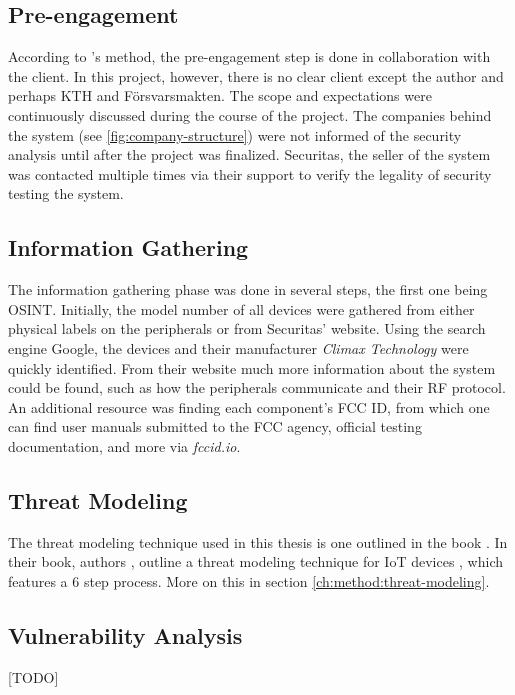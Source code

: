 \subsection{Pre-engagement}
According to \citeauthor{weidman2014}'s method, the pre-engagement step is done in collaboration with the client. In this project, however, there is no clear client except the author and perhaps KTH and Försvarsmakten. The scope and expectations were continuously discussed during the course of the project. The companies behind the system (see \ref{fig:company-structure}) were not informed of the security analysis until after the project was finalized. Securitas, the seller of the system was contacted multiple times via their support to verify the legality of security testing the system.

\subsection{Information Gathering}
The information gathering phase was done in several steps, the first one being \gls{OSINT}. Initially, the model number of all devices were gathered from either physical labels on the peripherals or from Securitas' website. Using the search engine Google, the devices and their manufacturer \textit{Climax Technology} were quickly identified. From their website much more information about the system could be found, such as how the peripherals communicate and their \gls{RF} protocol. An additional resource was finding each component's FCC ID, from which one can find user manuals submitted to the FCC agency, official testing documentation, and more via \textit{fccid.io}.

\subsection{Threat Modeling}
The threat modeling technique used in this thesis is one outlined in the book . In their book, authors \citeauthor{guzman2017iot}, outline a threat modeling technique for IoT devices \citeauthor{guzman2017iot}, which features a 6 step process. More on this in section \ref{ch:method:threat-modeling}.

\subsection{Vulnerability Analysis}
[TODO]


